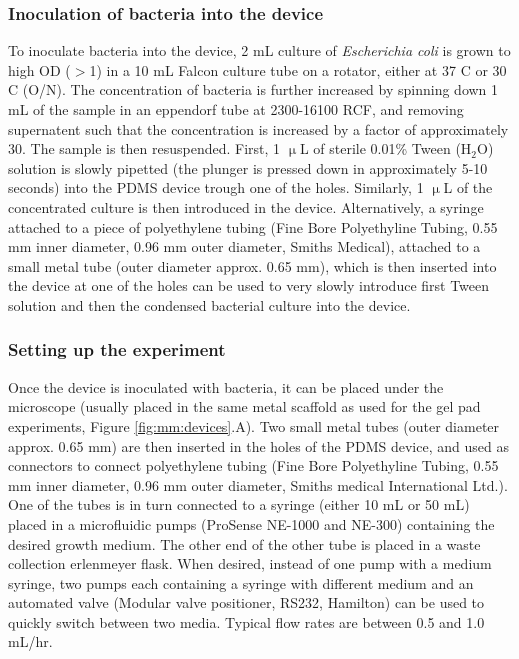 \subsubsection{Inoculation of bacteria into the device}
To inoculate bacteria into the device, 2 mL culture of \textit{Escherichia coli} is grown to high OD ($>$1) in a 10 mL Falcon culture tube on a rotator, either at 37 C or 30 C (O/N). 
The concentration of bacteria is further increased by spinning down 1 mL of the sample in an eppendorf tube at 2300-16100 RCF, and removing supernatent such that the concentration is increased by a factor of approximately 30. The sample is then resuspended.
%
First, 1 $\upmu$L of sterile 0.01\% Tween ($\text{H}_2\text{O}$) solution is slowly pipetted (the plunger is pressed down in approximately 5-10 seconds) into the PDMS device trough one of the holes.
Similarly, 1 $\upmu$L of the concentrated culture is then introduced in the device.
%
Alternatively, a syringe attached to a piece of polyethylene tubing (Fine Bore Polyethyline Tubing, 0.55 mm inner diameter, 0.96 mm outer diameter, Smiths Medical), attached to a small metal tube (outer diameter approx. 0.65 mm), which is then inserted into the device at one of the holes can be used to very slowly introduce first Tween solution and then the condensed bacterial culture into the device.

\subsubsection{Setting up the experiment}
Once the device is inoculated with bacteria, it can be placed under the microscope (usually placed in the same metal scaffold as used for the gel pad experiments, Figure \ref{fig:mm:devices}.A). 
Two small metal tubes (outer diameter approx. 0.65 mm) are then inserted in the holes of the PDMS device, and used as connectors to connect polyethylene tubing (Fine Bore Polyethyline Tubing, 0.55 mm inner diameter, 0.96 mm outer diameter, Smiths medical International Ltd.).
One of the tubes is in turn connected to a syringe (either 10 mL or 50 mL) placed in a microfluidic pumps (ProSense NE-1000 and NE-300) containing the desired growth medium.
The other end of the other tube is placed in a waste collection erlenmeyer flask.
When desired, instead of one pump with a medium syringe, two pumps each containing a syringe with different medium and an automated valve (Modular valve positioner, RS232, Hamilton) can be used to quickly switch between two media.
Typical flow rates are between 0.5 and 1.0 mL/hr.

